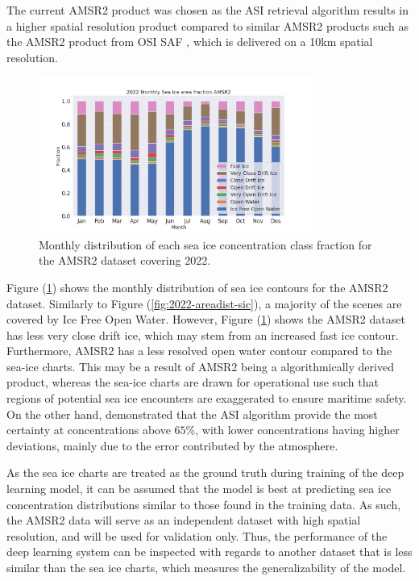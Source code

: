 \documentclass[../main/thesis.tex]{subfiles}
\begin{document}
The current AMSR2 product was chosen as the ASI retrieval algorithm \citep{Spreen2008} results in a higher spatial resolution product compared to similar AMSR2 products such as the AMSR2 product from OSI SAF \citep{Lavelle2016}, which is delivered on a 10km spatial resolution.

\begin{figure}
    \centering
    \includegraphics[width=0.8\textwidth]{2022-sic-distribution_amsr2}
    \caption{\label{fig:dist-amsr2}Monthly distribution of each sea ice concentration class fraction for the AMSR2 dataset covering 2022.}
\end{figure}

Figure (\ref{fig:dist-amsr2}) shows the monthly distribution of sea ice contours for the AMSR2 dataset. Similarly to Figure (\ref{fig:2022-areadist-sic}), a majority of the scenes are covered by Ice Free Open Water. However, Figure (\ref{fig:dist-amsr2}) shows the AMSR2 dataset has less very close drift ice, which may stem from an increased fast ice contour. Furthermore, AMSR2 has a less resolved open water contour compared to the sea-ice charts. This may be a result of AMSR2 being a algorithmically derived product, whereas the sea-ice charts are drawn for operational use such that regions of potential sea ice encounters are exaggerated to ensure maritime safety. On the other hand, \citet{Spreen2008} demonstrated that the ASI algorithm provide the most certainty at concentrations above $65\%$, with lower concentrations having higher deviations, mainly due to the error contributed by the atmosphere. 

As the sea ice charts are treated as the ground truth during training of the deep learning model, it can be assumed that the model is best at predicting sea ice concentration distributions similar to those found in the training data. As such, the AMSR2 data will serve as an independent dataset with high spatial resolution, and will be used for validation only. Thus, the performance of the deep learning system can be inspected with regards to another dataset that is less similar than the sea ice charts, which measures the generalizability of the model.
\end{document}

